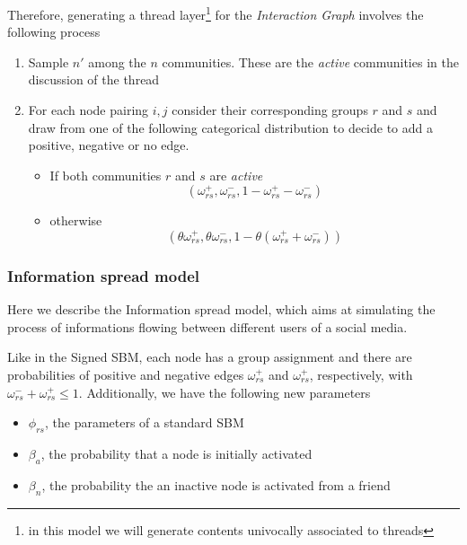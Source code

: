 Therefore, generating a thread layer\footnote{in this model we will generate contents univocally associated to threads} for the \emph{Interaction Graph} involves the following process
\begin{enumerate}
	\item Sample $n'$ among the $n$ communities. These are the
	      \emph{active} communities in the discussion of the thread
	\item For each node pairing $i, j$ consider their corresponding groups $r$ and
	      $s$ and draw from one of the following categorical distribution to decide to add
	      a positive, negative or no edge.
	      \begin{itemize}
		      \item If both communities $r$ and $s$ are \emph{active}
		            \begin{equation*}
			            (\omega _{rs} ^{+}, \omega _{rs} ^{-}, 1 - \omega _{rs} ^{+} - \omega _{rs} ^{-})
		            \end{equation*}
		      \item otherwise
		            \begin{equation*}
			            (\theta \omega _{rs} ^{+}, \theta \omega _{rs} ^{-}, 1 - \theta (\omega _{rs} ^{+} + \omega _{rs} ^{-}))
		            \end{equation*}

	      \end{itemize}

\end{enumerate}

\subsubsection{Information spread model}%
\label{ssub:information_spread_model}

Here we describe the Information spread model, which aims at simulating the
process of informations flowing between different users of a social media.

Like in the Signed SBM, each node has a group assignment and there are probabilities of
positive and negative edges $\omega _{rs}^{+}  $ and $\omega _{rs}^{+}  $,
respectively, with $\omega ^{-} _{rs} + \omega ^{+} _{rs}
	\leq 1$. Additionally, we have the following new parameters

\begin{itemize}
	\item ${\phi_{rs} }$, the parameters of a standard SBM
	\item $\beta _a$, the probability that a node is initially activated
	\item $\beta _n$, the probability the an inactive node is activated
	      from a friend
\end{itemize}

